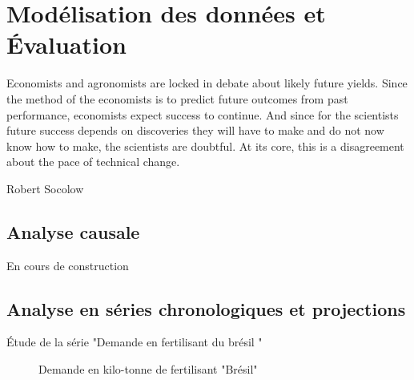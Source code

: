 \chapter{Modélisation des données et Évaluation}
\epigraph{Economists and agronomists are locked in debate about likely
future yields. Since the method of the economists is to predict
future outcomes from past performance, economists expect
success to continue. And since for the scientists future success
depends on discoveries they will have to make and do not now
know how to make, the scientists are doubtful. At its core, this is
a disagreement about the pace of technical change.}{Robert
Socolow}
\cleardoublepage

	\section{Analyse causale}
	\begin{Huge}{ En cours de construction}
		\end{Huge}
	\section{Analyse en séries chronologiques et projections}
	Étude de la série "Demande en fertilisant du brésil "
	\begin{figure}[H]
		\centering
		\caption{Demande en kilo-tonne de fertilisant "Brésil"}
		\label{fig:dem}
	\end{figure}
